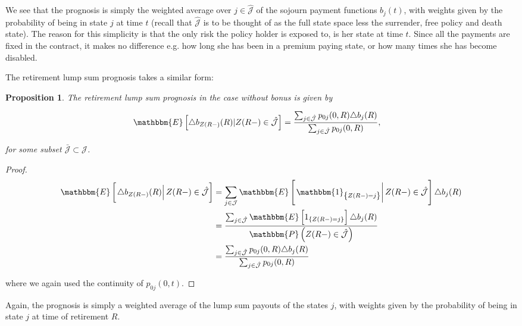 \documentclass{article}
\newcommand{\1}[1]{\mathbbm{1}_{\left\lbrace #1 \right\rbrace}}
\newcommand{\expec}[1][def]{\mathbbm{E} \left[ #1 \right]}
\newcommand{\econd}[2][def]{\mathbbm{E} \left[ \left. #1 \right| #2 \right]}
\newcommand{\probability}[1][def]{\mathbbm{P} \left( #1 \right)}
\theoremstyle{break}
\newtheorem{proposition}[definition]{Proposition}%
\theoremstyle{remark}
\numberwithin{equation}{section}
\begin{document}
We see that the prognosis is simply the weighted average over $j \in \hat{\mathcal{J}}$ of the sojourn payment functions $b_j(t)$, with weights given by the probability of being in state $j$ at time $t$ (recall that $\hat{\mathcal{J}}$ is to be thought of as the full state space less the surrender, free policy and death state). The reason for this simplicity is that the only risk the policy holder is exposed to, is her state at time $t$. Since all the payments are fixed in the contract, it makes no difference e.g. how long she has been in a premium paying state, or how many times she has become disabled.

The retirement lump sum prognosis takes a similar form:

\begin{proposition} \label{RetireWithoutBonus}
The retirement lump sum prognosis in the case without bonus is given by

\begin{align*}
    \expec[ \triangle b_{Z(R-)}(R) | Z(R-) \in \hat{\mathcal{J}}]
    &= \frac{\sum_{j \in \hat{\mathcal{J}}} p_{0j}(0,R) \triangle b_j(R)}{\sum_{j \in \hat{\mathcal{J}}} p_{0j}(0,R)},
\end{align*}

for some subset $\bar{\mathcal{J}} \subset \mathcal{J}$.
\end{proposition}

\begin{proof}
\begin{align*}
	\econd[\triangle b_{Z(R-)}(R)]{Z(R-) \in \hat{\mathcal{J}}} &= \sum_{j \in \mathcal{J}} \econd[\1{Z(R-)=j}]{Z(R-) \in \hat{\mathcal{J}}} \triangle b_j(R) \\
	&= \frac{\sum_{j \in \hat{\mathcal{J}}} \expec[ 1_{\{Z(R-)=j\}} ] \triangle b_j(R)}{\probability[Z(R-) \in \hat{\mathcal{J}}]} \\
	&= \frac{\sum_{j \in \hat{\mathcal{J}}} p_{0j}(0,R) \triangle b_j(R)}{\sum_{j \in \hat{\mathcal{J}}} p_{0j}(0,R)}
\end{align*}

where we again used the continuity of $p_{0j}(0,t)$.
\end{proof}

Again, the prognosis is simply a weighted average of the lump sum payouts of the states $j$, with weights given by the probability of being in state $j$ at time of retirement $R$.
\end{document}
